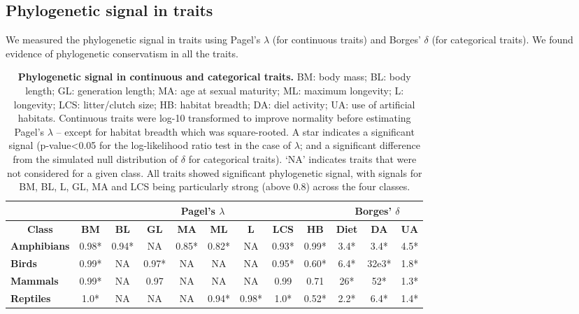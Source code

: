 \documentclass[11pt]{article}
\renewcommand{\baselinestretch}{1}
\begin{document}
\subsection{Phylogenetic signal in traits}
We measured the phylogenetic signal in traits using Pagel's $\lambda$ (for continuous traits) and Borges' $\delta$ (for categorical traits).
We found evidence of phylogenetic conservatism in all the traits.

\begin{table}[h!]
\renewcommand{\baselinestretch}{1}
\renewcommand{\arraystretch}{1.2}
\begin{center}\fontsize{9}{11}\selectfont
\caption[]{\textbf{Phylogenetic signal in continuous and categorical traits.} BM: body mass; BL: body length; GL: generation length; MA: age at sexual maturity; ML: maximum longevity; L: longevity; LCS: litter/clutch size; HB: habitat breadth; DA: diel activity; UA: use of artificial habitats. Continuous traits were log-10 transformed to improve normality before estimating Pagel’s $\lambda$ – except for habitat breadth which was square-rooted. A star indicates a significant signal (p-value<0.05 for the log-likelihood ratio test in the case of $\lambda$; and a significant difference from the simulated null distribution of $\delta$ for categorical traits). ‘NA’ indicates traits that were not considered for a given class. All traits showed significant phylogenetic signal, with signals for BM, BL, L, GL, MA and LCS being particularly strong (above 0.8) across the four classes. }
\label{physig}  
\begin{tabular}{l|c|c|c|c|c|c|c|c|c|c|c|}
\cline{2-12}
                                          & \multicolumn{8}{c|}{\textbf{Pagel's $\lambda$}}                                                                       & \multicolumn{3}{c|}{\textbf{Borges' $\delta$}} \\ \hline
\multicolumn{1}{|c|}{\textbf{Class}}      & \textbf{BM} & \textbf{BL} & \textbf{GL} & \textbf{MA} & \textbf{ML} & \textbf{L} & \textbf{LCS} & \textbf{HB} & \textbf{Diet} & \textbf{DA} & \textbf{UA} \\ \hline
\multicolumn{1}{|l|}{\textbf{Amphibians}} & 0.98*       & 0.94*       & NA          & 0.85*       & 0.82*       & NA         & 0.93*        & 0.99*       & 3.4*         & 3.4*        & 4.5*        \\ %
\multicolumn{1}{|l|}{\textbf{Birds}}      & 0.99*       & NA          & 0.97*       & NA          & NA          & NA         & 0.95*        & 0.60*       & 6.4*         & 32e3*       & 1.8*        \\ %
\multicolumn{1}{|l|}{\textbf{Mammals}}    & 0.99*       & NA          & 0.97        & NA          & NA          & NA         & 0.99         & 0.71        & 26*         & 52*         & 1.3*        \\ %
\multicolumn{1}{|l|}{\textbf{Reptiles}}   & 1.0*        & NA          & NA          & NA          & 0.94*       & 0.98*      & 1.0*         & 0.52*       & 2.2*        & 6.4*        & 1.4*        \\ \hline
\end{tabular}
\end{center}
\end{table}
\end{document}
